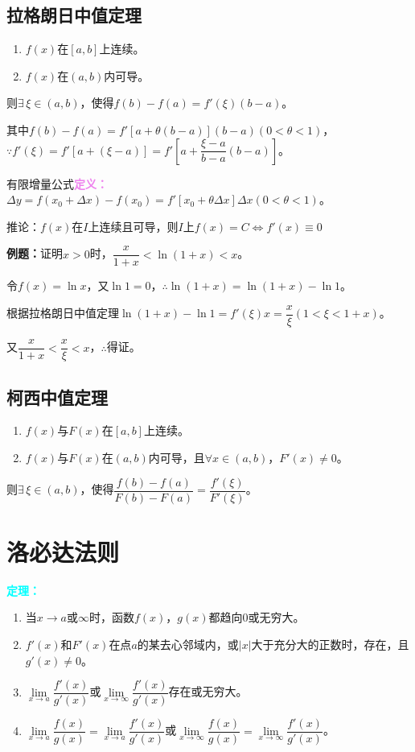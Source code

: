 \documentclass[UTF8, 12pt]{ctexart}
\begin{document}
\subsection{拉格朗日中值定理}

\begin{enumerate}
    \item $f(x)$在$[a,b]$上连续。
    \item $f(x)$在$(a,b)$内可导。
\end{enumerate}

则$\exists\,\xi\in(a,b)$，使得$f(b)-f(a)=f'(\xi)(b-a)$。

其中$f(b)-f(a)=f'[a+\theta(b-a)](b-a)(0<\theta<1)$，$\because f'(\xi)=f'[a+(\xi-a)]=f'[a+\dfrac{\xi-a}{b-a}(b-a)]$。\medskip

有限增量公式\textcolor{violet}{\textbf{定义：}}$\Delta y=f(x_0+\Delta x)-f(x_0)=f'[x_0+\theta\Delta x]\Delta x(0<\theta<1)$。

推论：$f(x)$在$I$上连续且可导，则$I$上$f(x)=C\Leftrightarrow f'(x)\equiv 0$

\textbf{例题：}证明$x>0$时，$\dfrac{x}{1+x}<\ln(1+x)<x$。

令$f(x)=\ln x$，又$\ln 1=0$，$\therefore\ln(1+x)=\ln(1+x)-\ln 1$。

根据拉格朗日中值定理$\ln(1+x)-\ln 1=f'(\xi)x=\dfrac{x}{\xi}(1<\xi<1+x)$。

又$\dfrac{x}{1+x}<\dfrac{x}{\xi}<x$，$\therefore$得证。

\subsection{柯西中值定理}

\begin{enumerate}
    \item $f(x)$与$F(x)$在$[a,b]$上连续。
    \item $f(x)$与$F(x)$在$(a,b)$内可导，且$\forall x\in(a,b)$，$F'(x)\neq 0$。
\end{enumerate}

则$\exists\,\xi\in(a,b)$，使得$\dfrac{f(b)-f(a)}{F(b)-F(a)}=\dfrac{f'(\xi)}{F'(\xi)}$。

\section{洛必达法则}

\textcolor{aqua}{\textbf{定理：}}

\begin{enumerate}
    \item 当$x\to a\text{或}\infty$时，函数$f(x)$，$g(x)$都趋向0或无穷大。
    \item $f'(x)$和$F'(x)$在点$a$的某去心邻域内，或$\vert x\vert$大于充分大的正数时，存在，且$g'(x)\neq 0$。
    \item $\lim\limits_{x\to a}\dfrac{f'(x)}{g'(x)}$或$\lim\limits_{x\to\infty}\dfrac{f'(x)}{g'(x)}$存在或无穷大。
    \item $\lim\limits_{x\to a}\dfrac{f(x)}{g(x)}=\lim\limits_{x\to a}\dfrac{f'(x)}{g'(x)}$或$\lim\limits_{x\to\infty}\dfrac{f(x)}{g(x)}=\lim\limits_{x\to\infty}\dfrac{f'(x)}{g'(x)}$。
\end{enumerate}
\end{document}
